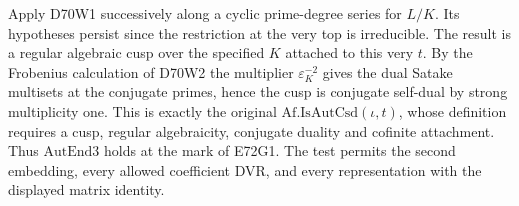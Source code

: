 Apply D70W1 successively along a cyclic prime-degree series for
$L/K$. Its hypotheses persist since the restriction at the very
top is irreducible. The result is a regular algebraic cusp over
the specified $K$ attached to this very $t$. By the Frobenius
calculation of D70W2 the multiplier $\varepsilon_K^{-2}$ gives the
dual Satake multisets at the conjugate primes, hence the cusp is
conjugate self-dual by strong multiplicity one. This is exactly
the original $\mathrm{Af.IsAutCsd}(\iota,t)$, whose definition
requires a cusp, regular algebraicity, conjugate duality and
cofinite attachment. Thus $\mathrm{AutEnd3}$ holds at the mark
of E72G1. The test permits the second embedding, every allowed
coefficient DVR, and every representation with the displayed
matrix identity.
